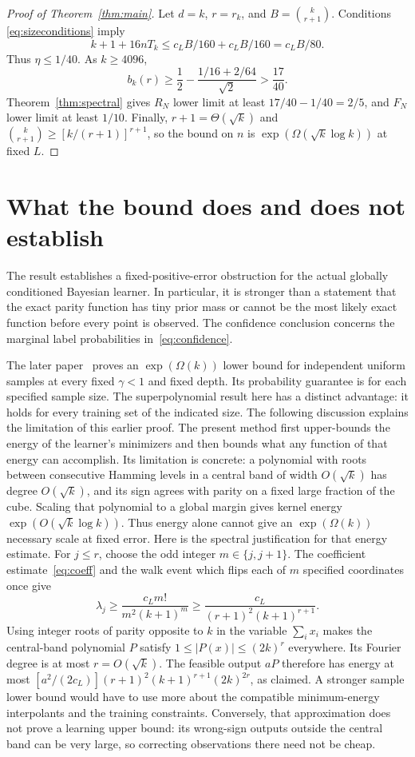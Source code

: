 \documentclass[11pt]{article}
\theoremstyle{remark}\newtheorem{remark}[theorem]{Remark}
\begin{document}
\begin{proof}[Proof of Theorem~\ref{thm:main}]
Let $d=k$, $r=r_k$, and $B=\binom{k}{r+1}$. Conditions
\eqref{eq:sizeconditions} imply
\[
 k+1+16nT_k\le c_LB/160+c_LB/160=c_LB/80.
\]
Thus $\eta\le1/40$. As $k\ge4096$,
\[
 b_k(r)\ge\frac12-\frac{1/16+2/64}{\sqrt2}
          >\frac{17}{40}.
\]
Theorem~\ref{thm:spectral} gives $R_N$ lower limit at least
$17/40-1/40=2/5$, and $F_N$ lower limit at least $1/10$.
Finally, $r+1=\Theta(\sqrt{k})$ and
$\binom{k}{r+1}\ge[k/(r+1)]^{r+1}$, so the bound on $n$ is
$\exp(\Omega(\sqrt{k}\log k))$ at fixed $L$.
\end{proof}

\section{What the bound does and does not establish}
The result establishes a fixed-positive-error obstruction for the
actual globally conditioned Bayesian learner. In particular, it is
stronger than a statement that the exact parity function has tiny
prior mass or cannot be the most likely exact function before every
point is observed. The confidence conclusion concerns the marginal
label probabilities in~\eqref{eq:confidence}.

The later paper~\cite{subcritical-exponential} proves an
$\exp(\Omega(k))$ lower bound for independent uniform samples at every
fixed $\gamma<1$ and fixed depth. Its probability guarantee is for each
specified sample size. The superpolynomial result here has a distinct
advantage: it holds for every training set of the indicated size.
The following discussion explains the limitation of this earlier proof. The present
method first upper-bounds the energy of the learner's minimizers and
then bounds what any function of that energy can accomplish. Its
limitation is concrete: a polynomial with roots between consecutive
Hamming levels in a central band of width $O(\sqrt{k})$ has degree
$O(\sqrt{k})$, and its sign agrees with parity on a fixed large
fraction of the cube. Scaling that polynomial to a global margin
gives kernel energy $\exp(O(\sqrt{k}\log k))$. Thus energy alone
cannot give an $\exp(\Omega(k))$ necessary scale at fixed error.
Here is the spectral justification for that energy estimate.
For $j\le r$, choose the odd integer $m\in\{j,j+1\}$.
The coefficient estimate~\eqref{eq:coeff} and the walk event
which flips each of $m$ specified coordinates once give
\[
 \lambda_j\ge\frac{c_Lm!}{m^2(k+1)^m}
 \ge\frac{c_L}{(r+1)^2(k+1)^{r+1}}.
\]
Using integer roots of parity opposite to $k$ in the variable
$\sum_i x_i$ makes the central-band polynomial $P$ satisfy
$1\le|P(x)|\le(2k)^r$ everywhere. Its Fourier degree is at most
$r=O(\sqrt{k})$. The feasible output $aP$ therefore has energy
at most
$[a^2/(2c_L)](r+1)^2(k+1)^{r+1}(2k)^{2r}$, as claimed.
A stronger sample lower bound would have to use more about the
compatible minimum-energy interpolants and the training constraints.
Conversely, that approximation does not prove a learning upper
bound: its wrong-sign outputs outside the central band can be very
large, so correcting observations there need not be cheap.
\end{document}
